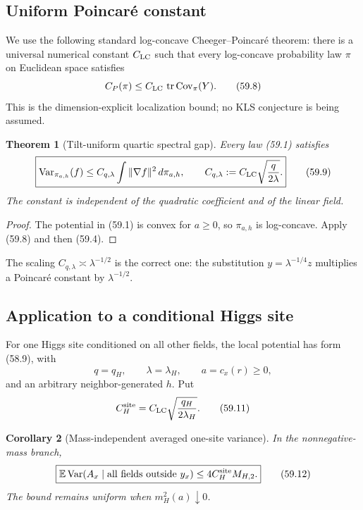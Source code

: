 \documentclass[11pt]{article}
\newtheorem{theorem}{Theorem}[section]
\newtheorem{corollary}[theorem]{Corollary}
\theoremstyle{remark}
\begin{document}
\subsection{Uniform Poincar\'e constant}

We use the following standard log-concave Cheeger--Poincar\'e theorem:
there is a universal numerical constant \(C_{\rm LC}\) such that every
log-concave probability law \(\pi\) on Euclidean space satisfies
\[
 C_P(\pi)
 \leq
 C_{\rm LC}\,
 \operatorname{tr}\operatorname{Cov}_\pi(Y).      \tag{59.8}
\]
This is the dimension-explicit localization bound; no KLS conjecture
is being assumed.

\begin{theorem}[Tilt-uniform quartic spectral gap]
\label{thm:v17v59-gap}
Every law (59.1) satisfies
\[
\boxed{
 \operatorname{Var}_{\pi_{a,h}}(f)
 \leq
 C_{q,\lambda}
 \int\|\nabla f\|^2\,d\pi_{a,h},\qquad
 C_{q,\lambda}
 :=
 C_{\rm LC}\sqrt{\frac{q}{2\lambda}}.}            \tag{59.9}
\]
The constant is independent of the quadratic coefficient and of the
linear field.
\end{theorem}

\begin{proof}
The potential in (59.1) is convex for \(a\geq0\), so
\(\pi_{a,h}\) is log-concave.  Apply (59.8) and then (59.4).
\end{proof}

The scaling \(C_{q,\lambda}\asymp\lambda^{-1/2}\) is the correct one:
the substitution \(y=\lambda^{-1/4}z\) multiplies a Poincar\'e
constant by \(\lambda^{-1/2}\).

\subsection{Application to a conditional Higgs site}

For one Higgs site conditioned on all other fields, the local
potential has form (58.9), with
\[
 q=q_H,\qquad\lambda=\lambda_H,\qquad
 a=c_x(r)\geq0,                                   \tag{59.10}
\]
and an arbitrary neighbor-generated \(h\).  Put
\[
 C_H^{\rm site}
 =
 C_{\rm LC}\sqrt{\frac{q_H}{2\lambda_H}}.         \tag{59.11}
\]

\begin{corollary}[Mass-independent averaged one-site variance]
\label{cor:v17v59-site}
In the nonnegative-mass branch,
\[
\boxed{
 \mathbb E\operatorname{Var}
 (A_x\mid\hbox{all fields outside }y_x)
 \leq
 4C_H^{\rm site}M_{H,2}.}                         \tag{59.12}
\]
The bound remains uniform when \(m_H^2(a)\downarrow0\).
\end{corollary}
\end{document}
